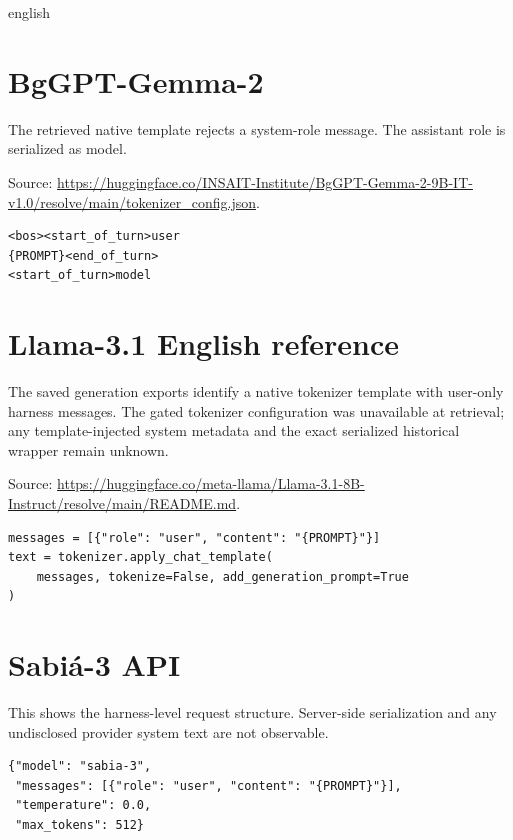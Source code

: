 \begin{otherlanguage*}{english}
\section{BgGPT-Gemma-2}
The retrieved native template rejects a system-role message. The assistant role is serialized as model.

Source: \url{https://huggingface.co/INSAIT-Institute/BgGPT-Gemma-2-9B-IT-v1.0/resolve/main/tokenizer_config.json}.

\begin{lstlisting}[language={},basicstyle=\ttfamily\footnotesize,breaklines=true,breakatwhitespace=false,columns=fullflexible,keepspaces=true,showstringspaces=false,numbers=none,frame=single]
<bos><start_of_turn>user
{PROMPT}<end_of_turn>
<start_of_turn>model

\end{lstlisting}

\section{Llama-3.1 English reference}
The saved generation exports identify a native tokenizer template with user-only harness messages. The gated tokenizer configuration was unavailable at retrieval; any template-injected system metadata and the exact serialized historical wrapper remain unknown.

Source: \url{https://huggingface.co/meta-llama/Llama-3.1-8B-Instruct/resolve/main/README.md}.

\begin{lstlisting}[language={},basicstyle=\ttfamily\footnotesize,breaklines=true,breakatwhitespace=false,columns=fullflexible,keepspaces=true,showstringspaces=false,numbers=none,frame=single]
messages = [{"role": "user", "content": "{PROMPT}"}]
text = tokenizer.apply_chat_template(
    messages, tokenize=False, add_generation_prompt=True
)
\end{lstlisting}

\section{Sabiá-3 API}
This shows the harness-level request structure. Server-side serialization and any undisclosed provider system text are not observable.

\begin{lstlisting}[language={},basicstyle=\ttfamily\footnotesize,breaklines=true,breakatwhitespace=false,columns=fullflexible,keepspaces=true,showstringspaces=false,numbers=none,frame=single]
{"model": "sabia-3",
 "messages": [{"role": "user", "content": "{PROMPT}"}],
 "temperature": 0.0,
 "max_tokens": 512}
\end{lstlisting}


\end{otherlanguage*}
